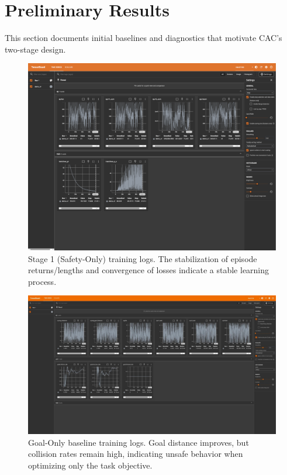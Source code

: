 \documentclass[10pt,conference]{IEEEtran}
\begin{document}
\section{Preliminary Results}
This section documents initial baselines and diagnostics that motivate CAC’s two-stage design.

\begin{figure}[h!]
    \centering
    \includegraphics[width=\columnwidth]{images/tensor_board_for_safety_policy.png}
    \caption{Stage 1 (Safety-Only) training logs. The stabilization of episode returns/lengths and convergence of losses indicate a stable learning process.}
    \label{fig:safety_training}
\end{figure}

\begin{figure}[h!]
    \centering
    \includegraphics[width=\columnwidth]{images/model_training.jpeg}
    \caption{Goal-Only baseline training logs. Goal distance improves, but collision rates remain high, indicating unsafe behavior when optimizing only the task objective.}
    \label{fig:goal_training}
\end{figure}
\end{document}
